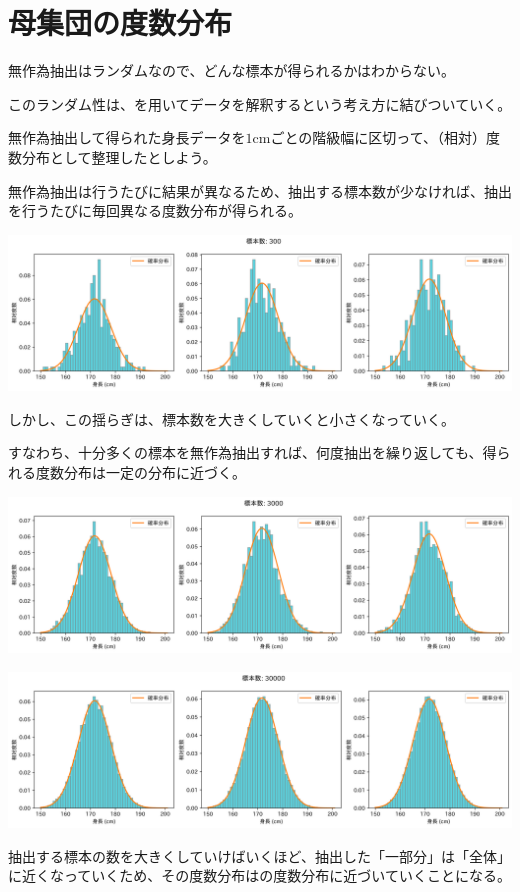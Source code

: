 \documentclass[../../../topic_statistics]{subfiles}
\begin{document}
\sectionline
\section{母集団の度数分布}

無作為抽出はランダムなので、どんな標本が得られるかはわからない。

このランダム性は、を用いてデータを解釈するという考え方に結びついていく。

\br

無作為抽出して得られた身長データを$1$cmごとの階級幅に区切って、（相対）度数分布として整理したとしよう。

\br

無作為抽出は行うたびに結果が異なるため、抽出する標本数が少なければ、抽出を行うたびに毎回異なる度数分布が得られる。

\includegraphics[width=0.95\linewidth]{./python/sampling-height_300.png}

しかし、この揺らぎは、標本数を大きくしていくと小さくなっていく。

すなわち、十分多くの標本を無作為抽出すれば、何度抽出を繰り返しても、得られる度数分布は一定の分布に近づく。

\includegraphics[width=0.95\linewidth]{./python/sampling-height_3000.png}

\includegraphics[width=0.95\linewidth]{./python/sampling-height_30000.png}

抽出する標本の数を大きくしていけばいくほど、抽出した「一部分」は「全体」に近くなっていくため、その度数分布はの度数分布に近づいていくことになる。
\end{document}
